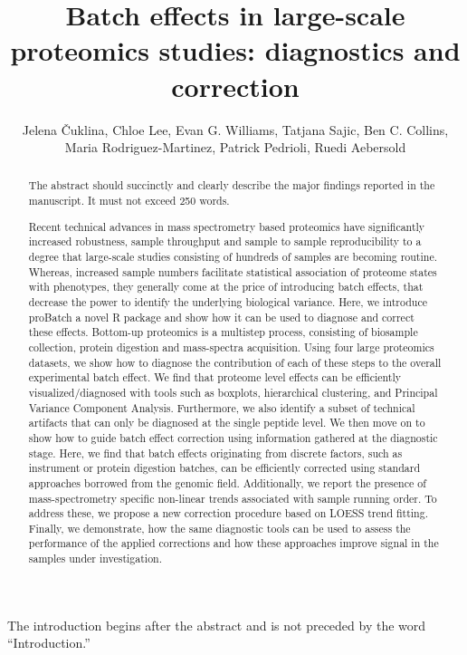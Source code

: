 \documentclass{jbc-article}
\title{Batch effects in large-scale proteomics studies: diagnostics and correction}
\author{Jelena Čuklina\authormark{1, 2, 3}, Chloe Lee\authormark{1}, Evan G. Williams\authormark{1}, Tatjana Sajic\authormark{1}, Ben C. Collins\authormark{1}, Maria Rodriguez-Martinez\authormark{3}, Patrick Pedrioli, Ruedi Aebersold\authormark{1, 4}}
\affil{Department of \authormark{1}Biology and \authormark{2}Pharmacology, University of Examples, Fictiontown, CA 10101}
\begin{document}
\maketitle

\begin{article}
\begin{abstract}
The abstract should succinctly and clearly describe the major findings reported in the manuscript. It must not exceed 250 words.

Recent technical advances in mass spectrometry based proteomics have significantly increased robustness, sample throughput and sample to sample reproducibility to a degree that large-scale studies consisting of hundreds of samples are becoming routine. Whereas, increased sample numbers facilitate statistical association of proteome states with phenotypes, they generally come at the price of introducing batch effects, that decrease the power to identify the underlying biological variance. Here, we introduce proBatch a novel R package and show how it can be used to diagnose and correct these effects.
Bottom-up proteomics is a multistep process, consisting of biosample collection, protein digestion and mass-spectra acquisition. Using four large proteomics datasets, we show how to diagnose the contribution of each of these steps to the overall experimental batch effect. We find that proteome level effects can be efficiently visualized/diagnosed with tools such as boxplots, hierarchical clustering, and Principal Variance Component Analysis. Furthermore, we also identify a subset of technical artifacts that can only be diagnosed at the single peptide level. 
We then move on to show how to guide batch effect correction using information gathered at the diagnostic stage. Here, we find that batch effects originating from discrete factors, such as instrument or protein digestion batches, can be efficiently corrected using standard approaches borrowed from the genomic field. Additionally, we report the presence of mass-spectrometry specific non-linear trends associated with sample running order. To address these, we propose a new correction procedure based on LOESS trend fitting. 
Finally, we demonstrate, how the same diagnostic tools can be used to assess the performance of the applied corrections and how these approaches improve signal in the samples under investigation. 

\end{abstract}

The introduction begins after the abstract and is not preceded by the word ``Introduction.''


\end{article}
\end{document}
